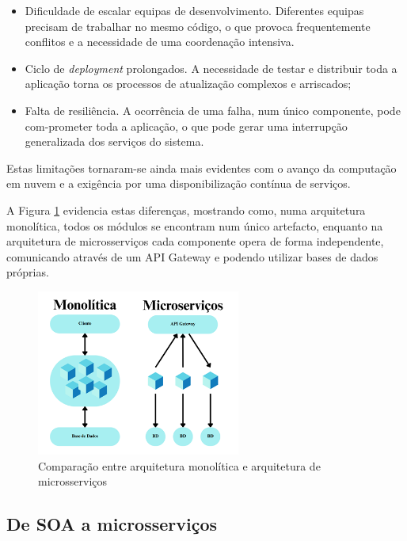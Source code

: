 \begin{itemize}
    \item Dificuldade de escalar equipas de desenvolvimento. Diferentes equipas precisam de trabalhar no mesmo código, o que provoca frequentemente conflitos e a necessidade de uma coordenação intensiva.
    \item Ciclo de \textit{deployment} prolongados. A necessidade de testar e distribuir toda a aplicação torna os processos de atualização complexos e arriscados;
    \item Falta de resiliência. A ocorrência de uma falha, num único componente, pode com-prometer toda a aplicação, o que pode gerar uma interrupção generalizada dos serviços do sistema.
\end{itemize}

Estas limitações tornaram-se ainda mais evidentes com o avanço da computação em nuvem e a exigência por uma disponibilização contínua de serviços.

A Figura \ref{fig:monolitica_microservicos} evidencia estas diferenças, mostrando como, numa arquitetura monolítica, todos os módulos se encontram num único artefacto, enquanto na arquitetura de microsserviços cada componente opera de forma independente, comunicando através de um API Gateway e podendo utilizar bases de dados próprias.


\begin{figure}[h]
    \centering
    \includegraphics[width=0.6\textwidth]{images/Diagramas/monilitica_vs_microservicos.png}
    \caption{Comparação entre arquitetura monolítica e arquitetura de microsserviços}
    \label{fig:monolitica_microservicos}
\end{figure}

\subsection{De SOA a microsserviços}


